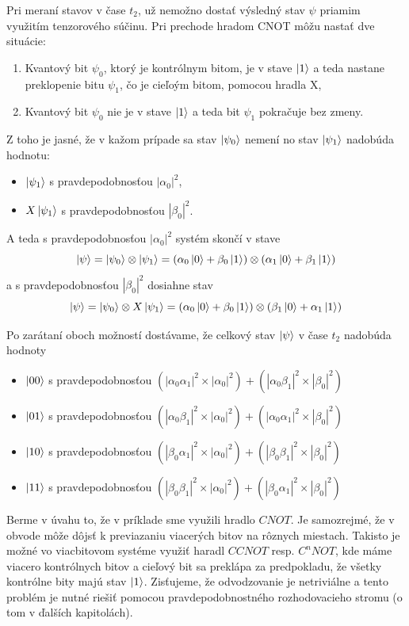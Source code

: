 Pri meraní stavov v čase \(t_2\), už nemožno dostať výsledný stav \(\psi\)
priamim využitím tenzorového súčinu. Pri prechode hradom CNOT môžu nastať
dve situácie:
\begin{enumerate}
    \item Kvantový bit \(\psi_0\), ktorý je kontrólnym bitom, je v stave 
\(\ket{1}\) a teda nastane preklopenie bitu \(\psi_1\), čo je cieľoým bitom,
pomocou hradla X,
    \item Kvantový bit \(\psi_0\) nie je v stave \(\ket{1}\) a teda bit 
\(\psi_1\) pokračuje bez zmeny.
\end{enumerate}

Z toho je jasné, že v kažom prípade sa stav \(\ket{\psi_0}\) nemení no
stav \(\ket{\psi_1}\) nadobúda hodnotu:
\begin{itemize}
    \item \(\ket{\psi_1}\) s pravdepodobnosťou \(|\alpha_0|^2\),
    \item \(X\ket{\psi_1}\) s pravdepodobnosťou \(|\beta_0|^2\).
\end{itemize}

A teda s pravdepodobnosťou \(|\alpha_0|^2\) systém skončí v stave
\[\Ket{\psi} =  \Ket{\psi_0} \otimes \Ket{\psi_1} = 
(\alpha_0\ket{0} + \beta_0\ket{1}) \otimes  (\alpha_1\ket{0} + \beta_1\ket{1})
\]
a s pravdepodobnosťou \(|\beta_0|^2\) dosiahne stav
\[\Ket{\psi} =  \Ket{\psi_0} \otimes X\Ket{\psi_1} = 
(\alpha_0\ket{0} + \beta_0\ket{1}) \otimes  (\beta_1\ket{0} + \alpha_1\ket{1})
\]

Po zarátaní oboch možností dostávame, že celkový stav \(\ket{\psi}\) v čase 
\(t_2\) nadobúda hodnoty 
\begin{itemize}
    \item[] \(\ket{00}\) s pravdepodobnosťou \((|\alpha_0\alpha_1|^2 \times |\alpha_0|^2) + (|\alpha_0\beta_1|^2 \times |\beta_0|^2)\)
    \item[] \(\ket{01}\) s pravdepodobnosťou \((|\alpha_0\beta_1|^2 \times |\alpha_0|^2) + (|\alpha_0\alpha_1|^2 \times |\beta_0|^2)\)
    \item[] \(\ket{10}\) s pravdepodobnosťou \((|\beta_0\alpha_1|^2 \times |\alpha_0|^2) + (|\beta_0\beta_1|^2 \times |\beta_0|^2)\)
    \item[] \(\ket{11}\) s pravdepodobnosťou \((|\beta_0\beta_1|^2 \times |\alpha_0|^2) + (|\beta_0\alpha_1|^2 \times |\beta_0|^2)\)
\end{itemize}


Berme v úvahu to, že v príklade sme využili hradlo \(CNOT\). Je samozrejmé, že
v obvode môže dôjsť k previazaniu viacerých bitov na rôznych miestach.
Takisto je možné vo viacbitovom systéme využiť haradl \(CCNOT\) resp. 
\(C^{n}NOT\), kde máme viacero kontrólnych bitov a cieľový bit sa preklápa
za predpokladu, že všetky kontrólne bity majú stav \(\ket{1}\).
Zisťujeme, že odvodzovanie je netriviálne a tento problém je nutné riešiť
pomocou pravdepodobnostného rozhodovacieho stromu (o tom v ďalších kapitolách).
